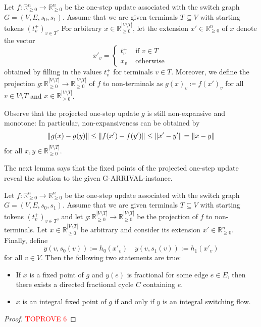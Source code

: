 \documentclass[a4paper,UKenglish,cleveref, autoref, thm-restate]{lipics-v2021}
\newcommand{\R}{\mathbb{R}}
\DeclarePairedDelimiter\norm{\lVert}{\rVert}
\newcommand{\problem}[1]{\textrm{#1}}
\newcommand{\garrival}{\problem{G-ARRIVAL}}
\begin{document}
\begin{definition}
    Let $f : \R^n_{\geq 0} \rightarrow \R^n_{\geq 0}$ be the one-step update associated with the switch graph $G = (V, E, s_0, s_1)$. Assume that we are given terminals $T \subseteq V$ with starting tokens $(t^+_v)_{v \in T}$. For arbitrary $x \in \R^{|V \setminus T|}_{\geq 0}$, let the extension $x' \in \R^n_{\geq 0}$ of $x$ denote the vector
    \[
        x'_v = \begin{cases}
            t^+_v & \text{ if } v \in T \\
            x_v & \text{ otherwise } 
        \end{cases}
    \]
    obtained by filling in the values $t^+_v$ for terminals $v \in T$. Moreover, we define the projection $g : \R^{|V \setminus T|}_{\geq 0} \rightarrow \R^{|V \setminus T|}_{\geq 0}$ of $f$ to non-terminals as $g(x)_v \coloneqq f(x')_v$
    for all $v \in V \setminus T$ and $x \in \R^{|V \setminus T|}_{\geq 0}$.
\end{definition}
Observe that the projected one-step update $g$ is still non-expansive and monotone: In particular, non-expansiveness can be obtained by
\[
    \norm{g(x) - g(y)} \leq \norm{f(x') - f(y')} \leq \norm{x' - y'} = \norm{x - y}
\]
for all $x, y \in \R_{\geq 0}^{|V \setminus T|}$.

The next lemma says that the fixed points of the projected one-step update reveal the solution to the given \garrival-instance. 

\begin{lemma}
\label{lemma:interpretation}
    Let $f : \R^n_{\geq 0} \rightarrow \R^n_{\geq 0}$ be the one-step update associated with the switch graph $G = (V, E, s_0, s_1)$. Assume that we are given terminals $T \subseteq V$ with starting tokens $(t^+_v)_{v \in T}$, and let $g : \R^{|V \setminus T|}_{\geq 0} \rightarrow \R^{|V \setminus T|}_{\geq 0}$ be the projection of $f$ to non-terminals. Let $x \in \R^{|V \setminus T|}_{\geq 0}$ be arbitrary and consider its extension $x' \in \R^n_{\geq 0}$. Finally, define 
    \[
        y(v, s_0(v)) := h_0(x'_v) \quad
        y(v, s_1(v)) := h_1(x'_v) 
    \]
    for all $v \in V$. Then the following two statements are true: 
    \begin{itemize}
        \item If $x$ is a fixed point of $g$ and $y(e)$ is fractional for some edge $e \in E$, then there exists a directed fractional cycle $C$ containing $e$. 
        \item $x$ is an integral fixed point of $g$ if and only if $y$ is an integral switching flow. 
    \end{itemize}
\end{lemma}
\begin{proof}\textcolor{red}{TOPROVE 6}\end{proof}
\end{document}
